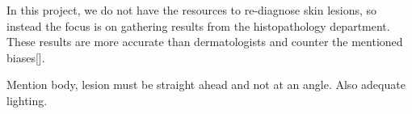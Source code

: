 In this project, we do not have the resources to re-diagnose skin lesions, so instead the focus is on gathering results from the histopathology department. These results are more accurate than dermatologists and counter the mentioned biases[]. 

Mention body, lesion must be straight ahead and not at an angle. Also adequate lighting.
